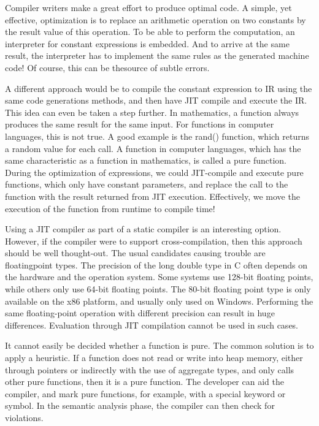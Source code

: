 Compiler writers make a great effort to produce optimal code. A simple, yet effective, optimization is to replace an arithmetic operation on two constants by the result value of this operation. To be able to perform the computation, an interpreter for constant expressions is embedded. And to arrive at the same result, the interpreter has to implement the same rules as the generated machine code! Of course, this can be thesource of subtle errors.\par

A different approach would be to compile the constant expression to IR using the same code generations methods, and then have JIT compile and execute the IR. This idea can even be taken a step further. In mathematics, a function always produces the same result for the same input. For functions in computer languages, this is not true. A good example is the rand() function, which returns a random value for each call. A function in computer languages, which has the same characteristic as a function in mathematics, is called a pure function. During the optimization of expressions, we could JIT-compile and execute pure functions, which only have constant parameters, and replace the call to the function with the result returned from JIT execution. Effectively, we move the execution of the function from runtime to compile time!\par

\begin{tcolorbox}[colback=blue!5!white,colframe=blue!75!black, title=Think about cross-compilation]
Using a JIT compiler as part of a static compiler is an interesting option. However, if the compiler were to support cross-compilation, then this approach should be well thought-out. The usual candidates causing trouble are floatingpoint types. The precision of the long double type in C often depends on the hardware and the operation system. Some systems use 128-bit floating points, while others only use 64-bit floating points. The 80-bit floating point type is only available on the x86 platform, and usually only used on Windows. Performing the same floating-point operation with different precision can result in huge differences. Evaluation through JIT compilation cannot be used in such cases.
\end{tcolorbox}

It cannot easily be decided whether a function is pure. The common solution is to apply a heuristic. If a function does not read or write into heap memory, either through pointers or indirectly with the use of aggregate types, and only calls other pure functions, then it is a pure function. The developer can aid the compiler, and mark pure functions, for example, with a special keyword or symbol. In the semantic analysis phase, the compiler can then check for violations.\par

